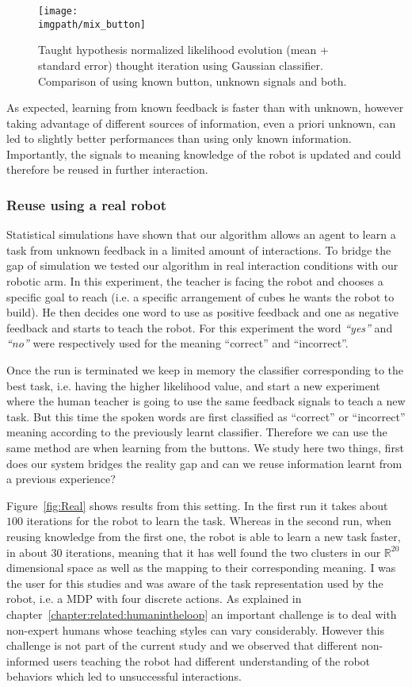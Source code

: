 \begin{figure}[!htbp]
  \centering
  \texttt{[image: \\imgpath/mix\_button]}
  \caption{Taught hypothesis normalized likelihood evolution (mean + standard error) thought iteration using Gaussian classifier. Comparison of using known button, unknown signals and both.}
  \label{fig:button}
\end{figure}

As expected, learning from known feedback is faster than with unknown, however taking advantage of different sources of information, even a priori unknown, can led to slightly better performances than using only known information. Importantly, the signals to meaning knowledge of the robot is updated and could therefore be reused in further interaction.

\subsubsection{Reuse using a real robot}

Statistical simulations have shown that our algorithm allows an agent to learn a task from unknown feedback in a limited amount of interactions. To bridge the gap of simulation we tested our algorithm in real interaction conditions with our robotic arm. In this experiment, the teacher is facing the robot and chooses a specific goal to reach (i.e. a specific arrangement of cubes he wants the robot to build). He then decides one word to use as positive feedback and one as negative feedback and starts to teach the robot. For this experiment the word \textit{``yes''} and \textit{``no''} were respectively used for the meaning ``correct'' and ``incorrect''. 

Once the run is terminated we keep in memory the classifier corresponding to the best task, i.e. having the higher likelihood value, and start a new experiment where the human teacher is going to use the same feedback signals to teach a new task. But this time the spoken words are first classified as ``correct'' or ``incorrect'' meaning according to the previously learnt classifier. Therefore we can use the same method are when learning from the buttons. We study here two things, first does our system bridges the reality gap and can we reuse information learnt from a previous experience? 

Figure~\ref{fig:Real} shows results from this setting. In the first run it takes about $100$ iterations for the robot to learn the task. Whereas in the second run, when reusing knowledge from the first one, the robot is able to learn a new task faster, in about $30$ iterations, meaning that it has well found the two clusters in our $\mathbb{R}^{20}$ dimensional space as well as the mapping to their corresponding meaning. I was the user for this studies and was aware of the task representation used by the robot, i.e. a MDP with four discrete actions. As explained in chapter~\ref{chapter:related:humanintheloop} an important challenge is to deal with non-expert humans whose teaching styles can vary considerably. However this challenge is not part of the current study and we observed that different non-informed users teaching the robot had different understanding of the robot behaviors which led to unsuccessful interactions.

